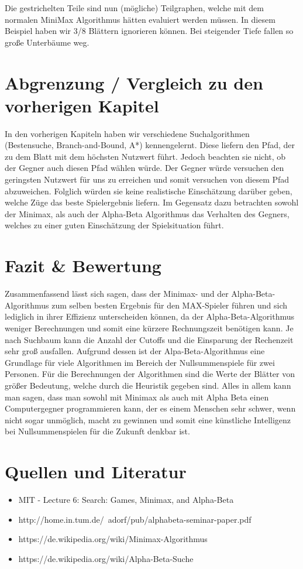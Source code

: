 Die gestrichelten Teile sind nun (mögliche) Teilgraphen, welche mit dem normalen MiniMax Algorithmus hätten evaluiert werden müssen. In diesem Beispiel haben wir 3/8 Blättern ignorieren können. Bei steigender Tiefe fallen so große Unterbäume weg.

\section{Abgrenzung / Vergleich zu den vorherigen Kapitel}

In den vorherigen Kapiteln haben wir verschiedene Suchalgorithmen (Bestensuche, Branch-and-Bound, A*) kennengelernt. Diese liefern den Pfad, der zu dem Blatt mit dem höchsten Nutzwert führt. Jedoch beachten sie nicht, ob der Gegner auch diesen Pfad wählen würde. Der Gegner würde versuchen den geringsten Nutzwert für uns zu erreichen und somit versuchen von diesem Pfad abzuweichen. Folglich würden sie keine realistische Einschätzung darüber geben, welche Züge das beste Spielergebnis liefern. Im Gegensatz dazu betrachten sowohl der Minimax, als auch der Alpha-Beta Algorithmus das Verhalten des Gegners, welches zu einer guten Einschätzung der Spielsituation führt.



\section{Fazit \& Bewertung}

Zusammenfassend lässt sich sagen, dass der Minimax- und der Alpha-Beta-Algorithmus zum selben besten Ergebnis für den MAX-Spieler führen und sich lediglich in ihrer Effizienz unterscheiden können, da der Alpha-Beta-Algorithmus weniger Berechnungen und somit eine kürzere Rechnungszeit benötigen kann. Je nach Suchbaum kann die Anzahl der Cutoffs und die Einsparung der Rechenzeit sehr groß ausfallen. Aufgrund dessen ist der Alpa-Beta-Algorithmus eine Grundlage für viele Algorithmen im Bereich der Nullsummenspiele für zwei Personen. Für die Berechnungen der Algorithmen sind die Werte der Blätter von größer Bedeutung, welche durch die Heuristik gegeben sind. Alles in allem kann man sagen, dass man sowohl mit Minimax als auch mit Alpha Beta einen Computergegner programmieren kann, der es einem Menschen sehr schwer, wenn nicht sogar unmöglich, macht zu gewinnen und somit eine künstliche Intelligenz bei Nullsummenspielen für die Zukunft denkbar ist.


\section{Quellen und Literatur}

\begin{itemize}
\item MIT - Lecture 6: Search: Games, Minimax, and Alpha-Beta
\item http://home.in.tum.de/~adorf/pub/alphabeta-seminar-paper.pdf
\item https://de.wikipedia.org/wiki/Minimax-Algorithmus
\item https://de.wikipedia.org/wiki/Alpha-Beta-Suche
\end{itemize}
